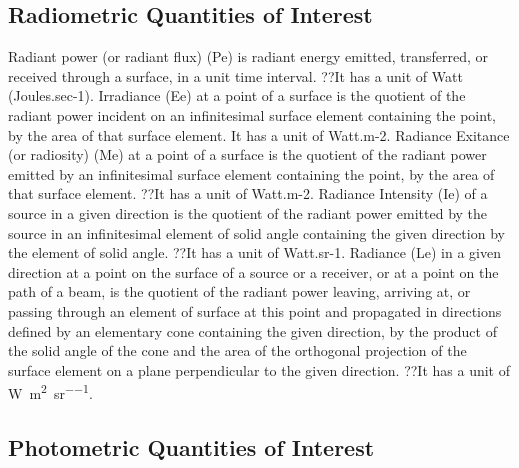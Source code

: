 \subsection{Radiometric Quantities of Interest}%
\label{subsec:radiometric-quantities-of-interest}

Radiant power (or radiant flux) (Pe) is radiant energy emitted, transferred, or received through a surface, in a unit time interval. ??It has a unit of Watt (Joules.sec-1).
Irradiance (Ee) at a point of a surface is the quotient of the radiant power incident on an infinitesimal surface element containing the point, by the area of that surface element. It has a unit of Watt.m-2.
Radiance Exitance (or radiosity) (Me) at a point of a surface is the quotient of the radiant power emitted by an infinitesimal surface element containing the point, by the area of that surface element. ??It has a unit of Watt.m-2.
Radiance Intensity (Ie) of a source in a given direction is the quotient of the radiant power emitted by the source in an infinitesimal element of solid angle containing the given direction by the element of solid angle. ??It has a unit of Watt.sr-1.
Radiance (Le) in a given direction at a point on the surface of a source or a receiver, or at a point on the path of a beam, is the quotient of the radiant power leaving, arriving at, or passing through an element of surface at this point and propagated in directions defined by an elementary cone containing the given direction, by the product of the solid angle of the cone and the area of the orthogonal projection of the surface element on a plane perpendicular to the given direction. ??It has a unit of  \si{\watt\per\meter\squared\per\steradian}.

\subsection{Photometric Quantities of Interest}%
\label{subsec:photometric-quantities-of-interest}

